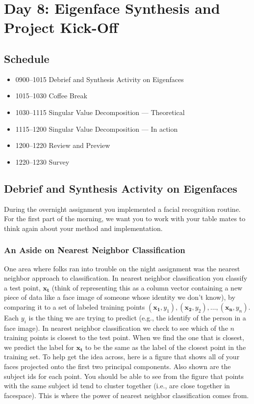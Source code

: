 \chapter{Day 8: Eigenface Synthesis and Project Kick-Off}

\section*{Schedule}
\begin{itemize}
\item 0900--1015		Debrief and Synthesis Activity on Eigenfaces
\item 1015--1030		Coffee Break
\item 1030--1115        Singular Value Decomposition --- Theoretical
\item 1115--1200        Singular Value Decomposition --- In action
\item 1200--1220        Review and Preview
\item 1220--1230        Survey
\end{itemize}

\section{Debrief and Synthesis Activity on Eigenfaces}

During the overnight assignment you implemented a facial recognition routine. For the first part of the morning, we want you to work with your table mates to think again about your method and implementation. 

\subsection{An Aside on Nearest Neighbor Classification}

One area where folks ran into trouble on the night assignment was the nearest neighbor approach to classification.  In nearest neighbor classification you classify a test point, $\mathbf{x_t}$ (think of representing this as a column vector containing a new piece of data like a face image of someone whose identity we don't know), by comparing it to a set of labeled training points $(\mathbf{x_1}, y_1), (\mathbf{x_2}, y_2), \ldots, (\mathbf{x_n}, y_n)$.  Each $y_i$ is the thing we are trying to predict (e.g., the identify of the person in a face image).  In nearest neighbor classification we check to see which of the $n$ training points is closest to the test point.  When we find the one that is closest, we predict the label for $\mathbf{x_t}$ to be the same as the label of the closest point in the training set.  To help get the idea across, here is a figure that shows all of your faces projected onto the first two principal components.  Also shown are the subject ids for each point.  You should be able to see from the figure that points with the same subject id tend to cluster together (i.e., are close together in facespace).  This is where the power of nearest neighbor classification comes from.

